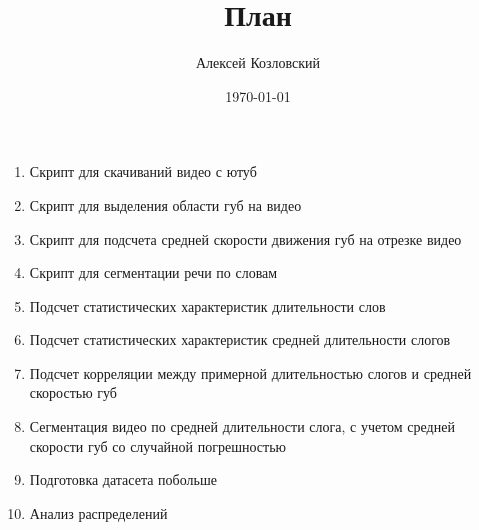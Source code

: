 \documentclass[a4paper,12pt]{article}
\author{Алексей Козловский}
\title{План}
\date{\today}
\begin{document}
\maketitle
\begin{enumerate}
    \item Скрипт для скачиваний видео с ютуб
    \item Скрипт для выделения области губ на видео
    \item Скрипт для подсчета средней скорости движения губ на отрезке видео
    \item Скрипт для сегментации речи по словам
    \item Подсчет статистических характеристик длительности слов
    \item Подсчет статистических характеристик средней длительности слогов
    \item Подсчет корреляции между примерной длительностью слогов и средней скоростью губ
    \item Сегментация видео по средней длительности слога, с учетом средней скорости губ со
        случайной погрешностью
    \item Подготовка датасета побольше
    \item Анализ распределений
\end{enumerate}
\end{document}
